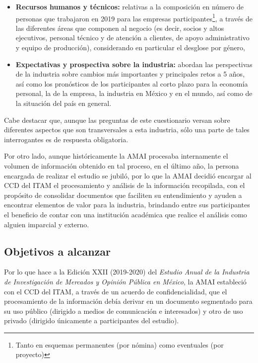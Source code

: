 \begin{itemize}
    \item[v)] \textbf{Recursos humanos y técnicos:} relativas a la composición en número de personas que trabajaron en 2019 para las empresas participantes\footnote{Tanto en esquemas permanentes (por nómina) como eventuales (por proyecto)}, a través de las diferentes áreas que componen al negocio (es decir, socios y altos ejecutivos, personal técnico y de atención a clientes, de apoyo administrativo y equipo de producción), considerando en particular el desglose por género,
    \item[vi)] \textbf{Expectativas y prospectiva sobre la industria:} abordan las perspectivas de la industria sobre cambios más importantes y principales retos a 5 años, así como los pronósticos de los participantes al corto plazo para la economía personal, la de la empresa, la industria en México y en el mundo, así como de la situación del país en general. 
\end{itemize}

Cabe destacar que, aunque las preguntas de este cuestionario versan sobre diferentes aspectos que son transversales a esta industria, sólo una parte de tales interrogantes es de respuesta obligatoria. 

Por otro lado, aunque históricamente la AMAI procesaba internamente el volumen de información obtenido en tal proceso, en el último año, la persona encargada de realizar el estudio se jubiló, por lo que la AMAI decidió encargar al CCD del ITAM el procesamiento y análisis de la información recopilada, con el propósito de consolidar documentos que faciliten su entendimiento y ayuden a encontrar elementos de valor para la industria, brindando entre sus participantes el beneficio de contar con una institución académica que realice el análisis como alguien imparcial y externo.

\subsection{Objetivos a alcanzar} \label{obj:bussiness}

Por lo que hace a la Edición XXII (2019-2020) del \emph{Estudio Anual de la Industria de Investigación de Mercados y Opinión Pública en México}, la AMAI estableció con el CCD del ITAM, a través de un acuerdo de confidencialidad, que el procesamiento de la información debía derivar en un documento segmentado para su uso público (dirigido a medios de comunicación e interesados) y otro de uso privado (dirigido únicamente a participantes del estudio).

